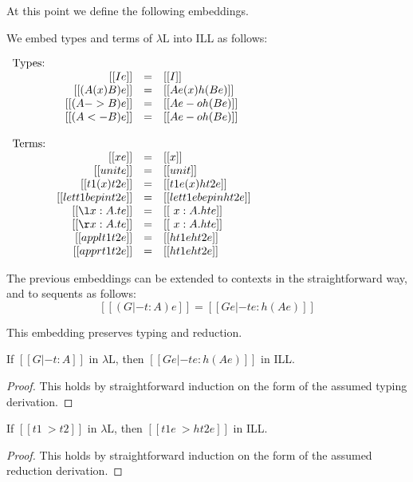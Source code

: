 \documentclass{llncs}
\begin{document}
At this point we define the following embeddings.
\begin{definition}
  \label{def:lambda-L_to_ILL}
  We embed types and terms of $\lambda\text{L}$ into ILL as follows:
  \begin{center}
    \begin{math}
      \begin{array}{lrllllllllllllllllll}
        \text{Types:}\\
        & [[I e]] & = & [[I]]\\
        & [[(A (x) B) e]] & = & [[A e (x) h(B e)]]\\
        & [[(A -> B) e]] & = & [[A e -o h(B e)]]\\
        & [[(A <- B) e]] & = & [[A e -o h(B e)]]\\                    
        \\
        \text{Terms:}\\
        & [[x e]] & = & [[x]]\\
        & [[unit e]] & = & [[unit]]\\
        & [[{t1 (x) t2} e]] & = & [[t1 e (x) h{t2 e}]]\\
        & [[{let t1 be p in t2} e]] & = & [[let t1 e be p in h{t2 e}]]\\
        & [[{\l x : A.t} e]] & = & [[\ x : A.h{t e}]]\\
        & [[{\r x : A.t} e]] & = & [[\ x : A.h{t e}]]\\
        & [[{appl t1 t2} e]] & = & [[h{t1 e} h{t2 e}]]\\
        & [[{appr t1 t2} e]] & = & [[h{t1 e} h{t2 e}]]\\
      \end{array}
    \end{math}
  \end{center}
  The previous embeddings can be extended to contexts in the
  straightforward way, and to sequents as follows:
  \[ [[(G |- t : A) e]] = [[G e |- t e : h(A e)]]\]
\end{definition}
\noindent
This embedding preserves typing and reduction.
\begin{lemma}
  \label{lemma:type_preserving_embedding}
  If $[[G |- t : A]]$ in $\lambda\text{L}$, then
  $[[G e |- t e : h(A e)]]$ in ILL.
\end{lemma}
\begin{proof}
  This holds by straightforward induction on the form of the assumed
  typing derivation.
\end{proof}
\begin{lemma}
  \label{lemma:reduction_preserving_embedding}
  If $[[t1 ~> t2]]$ in $\lambda\text{L}$, then $[[t1 e ~> h{t2 e}]]$
  in ILL.
\end{lemma}
\begin{proof}
  This holds by straightforward induction on the form of the assumed
  reduction derivation.
\end{proof}
\end{document}

